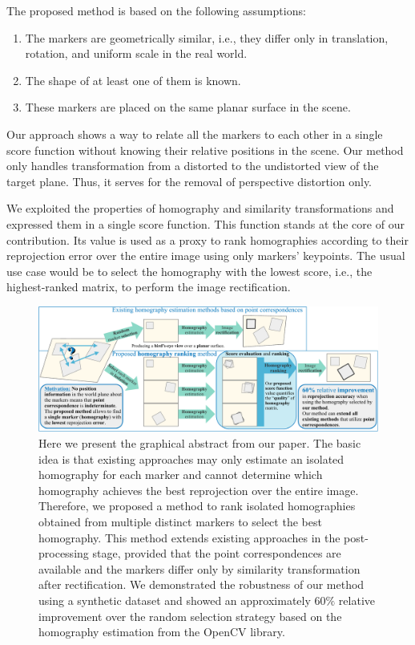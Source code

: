 The proposed method is based on the following assumptions:
\begin{enumerate}
    \item The markers are geometrically similar, i.e., they differ only in translation, rotation, and uniform scale in the real world.
    \item The shape of at least one of them is known.
    \item These markers are placed on the same planar surface in the scene.
\end{enumerate}
Our approach shows a way to relate all the markers to each other in a single score function without knowing their relative positions in the scene. Our method only handles transformation from a distorted to the undistorted view of the target plane. Thus, it serves for the removal of perspective distortion only.

We exploited the properties of homography and similarity transformations and expressed them in a single score function. This function stands at the core of our contribution. Its value is used as a proxy to rank homographies according to their reprojection error over the entire image using only markers' keypoints. The usual use case would be to select the homography with the lowest score, i.e., the highest-ranked matrix, to perform the image rectification.

\begin{figure}[t]
    \centerline{\includegraphics[width=\linewidth]{figures/homography/graphical_abstract.pdf}}
    \caption[Homography ranking graphical abstract]{Here we present the graphical abstract from our paper. The basic idea is that existing approaches may only estimate an isolated homography for each marker and cannot determine which homography achieves the best reprojection over the entire image. Therefore, we proposed a method to rank isolated homographies obtained from multiple distinct markers to select the best homography. This method extends existing approaches in the post-processing stage, provided that the point correspondences are available and the markers differ only by similarity transformation after rectification. We demonstrated the robustness of our method using a synthetic dataset and showed an approximately $60\%$ relative improvement over the random selection strategy based on the homography estimation from the OpenCV library.}
    \label{fig:GraphicalAbstract}
\end{figure}

